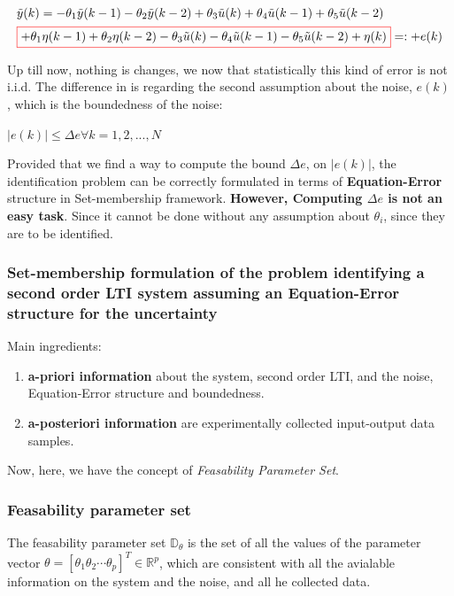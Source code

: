 \[
\begin{array}{l}
\tilde{y}(k)= -\theta_1 \tilde{y}(k - 1) - \theta_2 \tilde{y}(k - 2) + \theta_3 \tilde{u}(k) + \theta_4 \tilde{u}(k - 1) + \theta_5 \tilde{u}(k - 2) \\[1ex]
\textcolor{red}{\fbox{\textcolor{black}{$+ \theta_1\eta(k-1) + \theta_2\eta(k-2) - \theta_3\tilde{u}(k) - \theta_4\tilde{u}(k-1) - \theta_5\tilde{u}(k-2) + \eta(k) $}}} =: + e(k) \\
\end{array}
\]

Up till now, nothing is changes, we now that statistically this kind of error is not i.i.d. The difference in is regarding the second assumption about the noise, \(e(k)\), which is the boundedness of the noise:

\(\left| e(k)\right| \leq \Delta e \forall k = 1, 2, ..., N\)

Provided that we find a way to compute the bound \(\Delta e \), on \(\left| e(k)\right|\), the identification problem can be correctly formulated in terms of \textbf{Equation-Error} structure in Set-membership framework. \textbf{However, Computing \(\Delta e \) is not an easy task}. Since it cannot be done without any assumption about \(\theta_i\), since they are to be identified.

\subsubsection{Set-membership formulation of the problem identifying a second order LTI system assuming an Equation-Error structure for the uncertainty}
Main ingredients:
\begin{enumerate}
\item \textbf{a-priori information }about the system, second order LTI, and the noise, Equation-Error structure and boundedness.
\item\textbf{ a-posteriori information} are experimentally collected input-output data samples.
\end{enumerate}
Now, here, we have the concept of \textit{Feasability Parameter Set}.

\subsubsection{Feasability parameter set}
The feasability parameter set \(\mathbb{D}_\theta\) is the set of all the values of the parameter vector \(\theta = \left[ \theta_1 \theta_2 \cdots \theta_p \right]^T \in \mathbb{R}^p\), which are consistent with all the avialable information on the system and the noise, and all he collected data.\\

